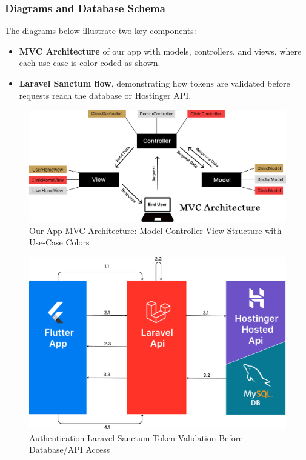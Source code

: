 \documentclass[12pt]{report}
\begin{document}
\subsubsection*{Diagrams and Database Schema}
The diagrams below illustrate two key components:
\begin{itemize}
\item \textbf{MVC Architecture} of our app with models, controllers, and views, where each use case is color-coded as shown.
\item \textbf{Laravel Sanctum flow}, demonstrating how tokens are validated before requests reach the database or Hostinger API.
\end{itemize}

\begin{figure}[H]
\centering
\includegraphics[width=1\textwidth]{images/MVC@2x.pdf}
\caption{Our App MVC Architecture: Model-Controller-View Structure with Use-Case Colors}
\end{figure}

\begin{figure}[H]
\centering
\includegraphics[width=1\textwidth]{images/sanctum@2x.pdf}
\caption{Authentication Laravel Sanctum Token Validation Before Database/API Access}
\end{figure}
\end{document}
